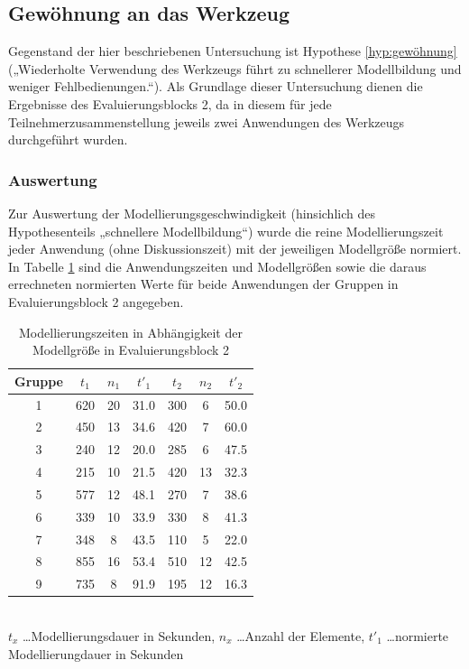 
\subsection{Gewöhnung an das Werkzeug} %
\label{sub:gewöhnung_an_das_werkzeug}

Gegenstand der hier beschriebenen Untersuchung ist Hypothese \ref{hyp:gewöhnung} („Wiederholte Verwendung des Werkzeugs führt zu schnellerer Modellbildung und weniger Fehlbedienungen.“). Als Grundlage dieser Untersuchung dienen die Ergebnisse des Evaluierungsblocks 2, da in diesem für jede Teilnehmerzusammenstellung jeweils zwei Anwendungen des Werkzeugs durchgeführt wurden.

\subsubsection{Auswertung} 

Zur Auswertung der Modellierungsgeschwindigkeit (hinsichlich des Hypothesenteils „schnellere Modellbildung“) wurde die reine Modellierungszeit jeder Anwendung (ohne Diskussionszeit) mit der jeweiligen Modellgröße normiert. In Tabelle 	\ref{tab:normierte_zeiten} sind die Anwendungszeiten und Modellgrößen sowie die daraus errechneten normierten Werte für beide Anwendungen der Gruppen in Evaluierungsblock 2 angegeben. 

\begin{table}[htbp]
	\centering
	\caption{Modellierungszeiten in Abhängigkeit der Modellgröße in Evaluierungsblock 2}
\begin{tabular}{| c || c | c | c || c | c | c |}
  \hline
   Gruppe    & $t_{1}$ & $n_{1}$ & $t'_{1}$ & $t_{2}$ & $n_{2}$ & $t'_{2}$ \\ \hline
   1     & 620 & 20 & 31.0 & 300 &  6 & 50.0 \\ 
   2     & 450 & 13 & 34.6 & 420 &  7 & 60.0 \\ 
   3     & 240 & 12 & 20.0 & 285 &  6 & 47.5 \\ 
   4     & 215 & 10 & 21.5 & 420 & 13 & 32.3 \\ 
   5     & 577 & 12 & 48.1 & 270 &  7 & 38.6 \\ 
   6     & 339 & 10 & 33.9 & 330 &  8 & 41.3 \\ 
   7     & 348 &  8 & 43.5 & 110 &  5 & 22.0 \\ 
   8     & 855 & 16 & 53.4 & 510 & 12 & 42.5 \\ 
   9     & 735 &  8 & 91.9 & 195 & 12 & 16.3 \\ \hline
\end{tabular} \\
\footnotesize $t_{x}$ \ldots Modellierungsdauer in Sekunden, $n_{x}$ \ldots Anzahl der Elemente, $t'_{1}$ \ldots normierte Modellierungdauer in Sekunden
	\label{tab:normierte_zeiten}
\end{table}

